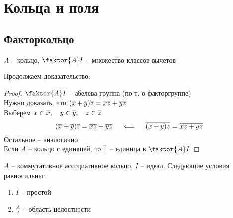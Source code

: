 \chapter{Кольца и поля}

\section{Факторкольцо}

\begin{remind}
	$ A $ -- кольцо, $ \faktor{A}I $ -- множество классов вычетов
\end{remind}

Продолжаем доказательство:

\begin{proof}
	$ \faktor{A}I $ -- абелева группа (по т. о факторгруппе) \\
	Нужно доказать, что $ (\overline{x} + \overline{y})\overline{z} = \overline{x}\overline{z} + \overline{y}\overline{z} $ \\
	Выберем $ x \in \overline{x}, \quad y \in \overline{y}, \quad z \in \overline{z} $
	$$ (\overline{x} + \overline{y})\overline{z} = \overline{x}\overline{z} + \overline{y}\overline{z} \quad \impliedby \quad \overline{(x + y)z} = \overline{xz + yz} $$
	Остальное -- аналогично \\
	Если $ A $ -- кольцо с единицей, то $ \overline1 $ -- единица в $ \faktor{A}I $
\end{proof}

\begin{theorem}
	$ A $ -- коммутативное ассоциативное кольцо, $ I $ -- идеал. Следующие условия равносильны:
	\begin{enumerate}
		\item\label{en:fak:1} $ I $ -- простой
		\item\label{en:fak:2} $ \frac{A}I $ -- область целостности
	\end{enumerate}
\end{theorem}

